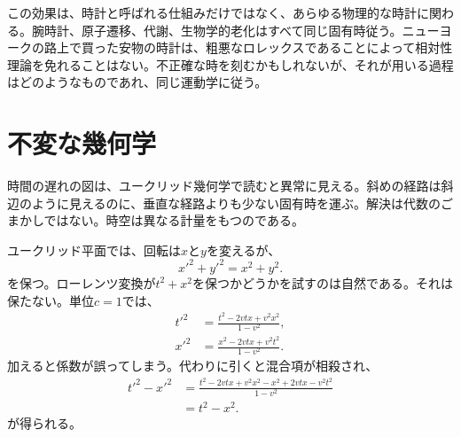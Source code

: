 この効果は、時計と呼ばれる仕組みだけではなく、あらゆる物理的な時計に関わる。腕時計、原子遷移、代謝、生物学的老化はすべて同じ固有時従う。ニューヨークの路上で買った安物の時計は、粗悪なロレックスであることによって相対性理論を免れることはない。不正確な時を刻むかもしれないが、それが用いる過程はどのようなものであれ、同じ運動学に従う。

\begin{classroomqa}
\end{classroomqa}

\begin{classroomqa}
\end{classroomqa}

\section{不変な幾何学}

時間の遅れの図は、ユークリッド幾何学で読むと異常に見える。斜めの経路は斜辺のように見えるのに、垂直な経路よりも少ない固有時を運ぶ。解決は代数のごまかしではない。時空は異なる計量をもつのである。

ユークリッド平面では、回転は\(x\)と\(y\)を変えるが、
\begin{equation}
x'^2+y'^2=x^2+y^2.
\label{eq:sr1-euclidean-invariant}
\end{equation}
を保つ。ローレンツ変換が\(t^2+x^2\)を保つかどうかを試すのは自然である。それは保たない。単位\(c=1\)では、
\begin{align}
t'^2
&=\frac{t^2-2vtx+v^2x^2}{1-v^2},\\
x'^2
&=\frac{x^2-2vtx+v^2t^2}{1-v^2}.
\end{align}
加えると係数が誤ってしまう。代わりに引くと混合項が相殺され、
\begin{align}
t'^2-x'^2
&=
\frac{t^2-2vtx+v^2x^2-x^2+2vtx-v^2t^2}{1-v^2}\\
&=t^2-x^2.
\label{eq:sr1-interval-invariance}
\end{align}
が得られる。

